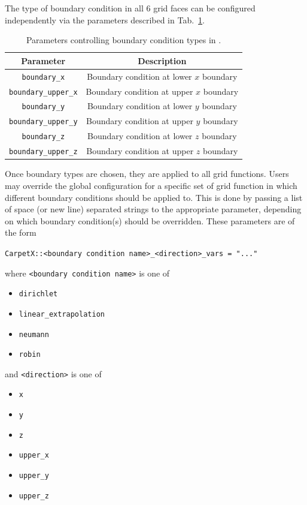 The type of boundary condition in all 6 grid faces can be configured independently via the parameters described in Tab.~\ref{tab:boundary_settings}.

\begin{table}[ht]
    \centering
    \begin{tabular}{cc}
    Parameter                   & Description                             \\\hline\hline
    \texttt{boundary\_x}        & Boundary condition at lower $x$ boundary\\
    \texttt{boundary\_upper\_x} & Boundary condition at upper $x$ boundary\\
    \texttt{boundary\_y}        & Boundary condition at lower $y$ boundary\\
    \texttt{boundary\_upper\_y} & Boundary condition at upper $y$ boundary\\
    \texttt{boundary\_z}        & Boundary condition at lower $z$ boundary\\
    \texttt{boundary\_upper\_z} & Boundary condition at upper $z$ boundary\\\hline\hline
    \end{tabular}
    \caption{Parameters controlling boundary condition types in \CarpetX.}
    \label{tab:boundary_settings}
\end{table}

  Once boundary types are chosen, they are applied to all grid functions. Users may override the global configuration for a specific set of grid function in which different boundary conditions should be applied to. This is done by passing a list of space (or new line) separated strings to the appropriate parameter, depending on which boundary condition(s) should be overridden. These parameters are of the form
%
  \begin{center}
    \texttt{CarpetX::<boundary condition name>\_<direction>\_vars = "..."}
  \end{center}
%
where \texttt{<boundary condition name>} is one of
%
\begin{itemize}
  \item \texttt{dirichlet}
  \item \texttt{linear\_extrapolation}
  \item \texttt{neumann}
  \item \texttt{robin}
\end{itemize}
%
and \texttt{<direction>} is one of
\begin{itemize}
  \item \texttt{x}
  \item \texttt{y}
  \item \texttt{z}
  \item \texttt{upper\_x}
  \item \texttt{upper\_y}
  \item \texttt{upper\_z}
\end{itemize}

